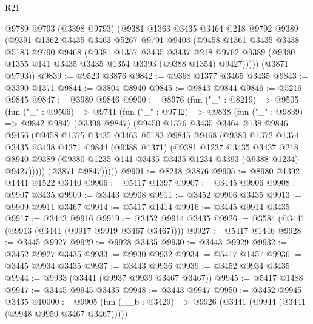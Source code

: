 \begin{lexlean}{R21}
\begin{coremodule}
    @9789
      @9793
      (@3398 @9793)
      (@9381
        @1363
        @3435
        @3464
        @218
        @9792
        @9389
        (@9391
          @1362
          @3435
          @3463
          @5267
          @9791
          @9403
          (@9458
            @1361
            @3435
            @3438
            @5183
            @9790
            @9468
            (@9381
              @1357
              @3435
              @3437
              @218
              @9762
              @9389
              (@9380 @1355 @141 @3435 @3435 @1354 @3393 (@9388 @1354) @9427)))))
      (@3871 @9793))
@9839 := @9523 @3876
@9842 := @9368 @1377 @3465 @3435
@9843 := @3390 @1371
@9844 := @3804 @8940
@9845 := @9843 @9844
@9846 := @5216 @9845
@9847 := @3989 @9846
@9900 := @8976
    (fun ("_" : @8219) =>
    @9505
      (fun ("_" : @9506) =>
      @9741
        (fun ("_" : @9742) =>
        @9838
          (fun ("_" : @9839) =>
          @9842
            @9847
            (@3398 @9847)
            (@9450
              @1376
              @3435
              @3464
              @138
              @9846
              @9456
              (@9458
                @1375
                @3435
                @3463
                @5183
                @9845
                @9468
                (@9380
                  @1372
                  @1374
                  @3435
                  @3438
                  @1371
                  @9844
                  (@9388 @1371)
                  (@9381
                    @1237
                    @3435
                    @3437
                    @218
                    @8940
                    @9389
                    (@9380 @1235 @141 @3435 @3435 @1234 @3393 (@9388 @1234) @9427)))))
            (@3871 @9847)))))
@9901 := @8218 @3876
@9905 := @8980 @1392 @1441 @1522 @3440
@9906 := @5417 @1397
@9907 := @3445 @9906
@9908 := @9907 @3435
@9909 := @3443 @9908
@9911 := @3452 @9906 @3435
@9913 := @9909 @9911 @3467
@9914 := @5417 @1414
@9916 := @3445 @9914 @3435
@9917 := @3443 @9916
@9919 := @3452 @9914 @3435
@9926 := @3584 (@3441 (@9913 (@3441 (@9917 @9919 @3467 @3467))))
@9927 := @5417 @1446
@9928 := @3445 @9927
@9929 := @9928 @3435
@9930 := @3443 @9929
@9932 := @3452 @9927 @3435
@9933 := @9930 @9932
@9934 := @5417 @1457
@9936 := @3445 @9934 @3435
@9937 := @3443 @9936
@9939 := @3452 @9934 @3435
@9944 := @9933 (@3441 (@9937 @9939 @3467 @3467))
@9945 := @5417 @1488
@9947 := @3445 @9945 @3435
@9948 := @3443 @9947
@9950 := @3452 @9945 @3435
@10000 := @9905
    (fun (__b : @3429) => @9926 (@3441 (@9944 (@3441 (@9948 @9950 @3467 @3467)))))

\end{coremodule}
\end{lexlean}
